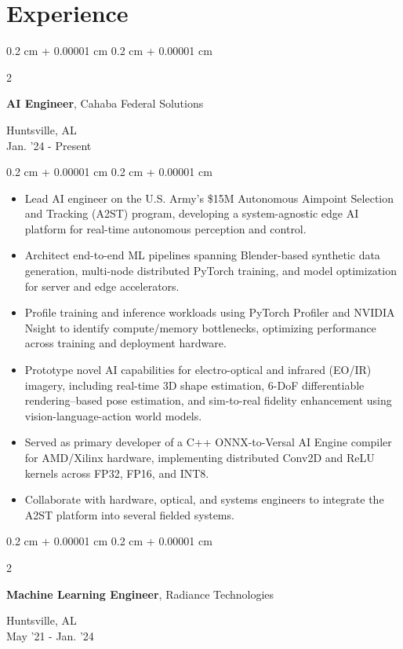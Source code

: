 \documentclass[10pt, letterpaper]{article}
\newenvironment{highlights}{
    \small\linespread{0.96}\selectfont
    \begin{itemize}[
        topsep=0.04 cm,
        parsep=0.02 cm,
        partopsep=0pt,
        itemsep=0pt,
        leftmargin=0.4 cm + 10pt
    ]
}{
    \end{itemize}
}
\newenvironment{onecolentry}{
    \begin{adjustwidth}{
        0.2 cm + 0.00001 cm
    }{
        0.2 cm + 0.00001 cm
    }
}{
    \end{adjustwidth}
}
\newenvironment{twocolentry}[2][]{
    \onecolentry
    \def\secondColumn{#2}
    \setcolumnwidth{\fill, 4.5 cm}
    \begin{paracol}{2}
}{
    \switchcolumn \raggedleft \secondColumn
    \end{paracol}
    \endonecolentry
}
\begin{document}
    \section{Experience}
\begin{twocolentry}{Huntsville, AL\\Jan. '24 - Present}
\textbf{AI Engineer}, Cahaba Federal Solutions
\end{twocolentry}
\begin{onecolentry}\begin{highlights}
\item {\small Lead AI engineer on the U.S. Army's \$15M Autonomous Aimpoint Selection and Tracking (A2ST) program, developing a system-agnostic edge AI platform for real-time autonomous perception and control.}
\item {\small Architect end-to-end ML pipelines spanning Blender-based synthetic data generation, multi-node distributed PyTorch training, and model optimization for server and edge accelerators.}
\item {\small Profile training and inference workloads using PyTorch Profiler and NVIDIA Nsight to identify compute/memory bottlenecks, optimizing performance across training and deployment hardware.}
\item {\small Prototype novel AI capabilities for electro-optical and infrared (EO/IR) imagery, including real-time 3D shape estimation, 6-DoF differentiable rendering--based pose estimation, and sim-to-real fidelity enhancement using vision-language-action world models.}
\item {\small Served as primary developer of a C++ ONNX-to-Versal AI Engine compiler for AMD/Xilinx hardware, implementing distributed Conv2D and ReLU kernels across FP32, FP16, and INT8.}
\item {\small Collaborate with hardware, optical, and systems engineers to integrate the A2ST platform into several fielded systems.}
\end{highlights}\end{onecolentry}
\vspace{0.3 cm}
\begin{twocolentry}{Huntsville, AL\\May '21 - Jan. '24}
\textbf{Machine Learning Engineer}, Radiance Technologies
\end{twocolentry}
\end{document}
